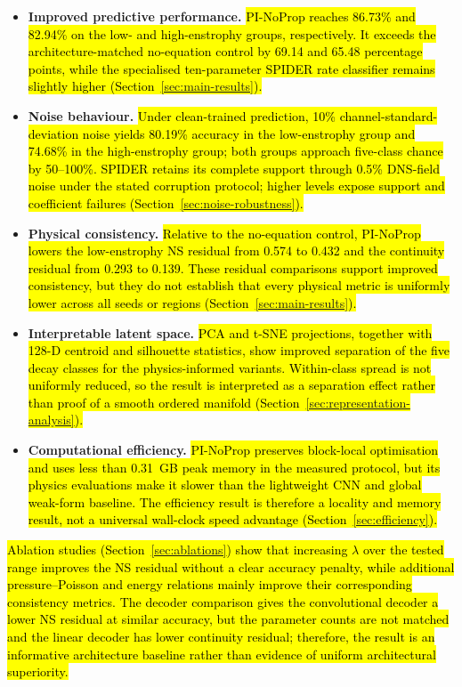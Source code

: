 \documentclass[preprint,12pt]{elsarticle}
\newcommand{\rev}[1]{\hl{#1}}
\begin{document}
\begin{itemize}
    \item \textbf{Improved predictive performance.} \rev{PI-NoProp reaches 86.73\% and 82.94\% on the low- and high-enstrophy groups, respectively. It exceeds the architecture-matched no-equation control by 69.14 and 65.48 percentage points, while the specialised ten-parameter SPIDER rate classifier remains slightly higher (Section~\ref{sec:main-results}).}
    
    \item \textbf{Noise behaviour.} \rev{Under clean-trained prediction, 10\% channel-standard-deviation noise yields 80.19\% accuracy in the low-enstrophy group and 74.68\% in the high-enstrophy group; both groups approach five-class chance by 50--100\%. SPIDER retains its complete support through 0.5\% DNS-field noise under the stated corruption protocol; higher levels expose support and coefficient failures (Section~\ref{sec:noise-robustness}).}
    
    \item \textbf{Physical consistency.} \rev{Relative to the no-equation control, PI-NoProp lowers the low-enstrophy NS residual from 0.574 to 0.432 and the continuity residual from 0.293 to 0.139. These residual comparisons support improved consistency, but they do not establish that every physical metric is uniformly lower across all seeds or regions (Section~\ref{sec:main-results}).}
    
    \item \textbf{Interpretable latent space.} \rev{PCA and t-SNE projections, together with 128-D centroid and silhouette statistics, show improved separation of the five decay classes for the physics-informed variants. Within-class spread is not uniformly reduced, so the result is interpreted as a separation effect rather than proof of a smooth ordered manifold (Section~\ref{sec:representation-analysis}).}
    
    \item \textbf{Computational efficiency.} \rev{PI-NoProp preserves block-local optimisation and uses less than 0.31~GB peak memory in the measured protocol, but its physics evaluations make it slower than the lightweight CNN and global weak-form baseline. The efficiency result is therefore a locality and memory result, not a universal wall-clock speed advantage (Section~\ref{sec:efficiency}).}
\end{itemize}

\rev{Ablation studies (Section~\ref{sec:ablations}) show that increasing $\lambda$ over the tested range improves the NS residual without a clear accuracy penalty, while additional pressure--Poisson and energy relations mainly improve their corresponding consistency metrics. The decoder comparison gives the convolutional decoder a lower NS residual at similar accuracy, but the parameter counts are not matched and the linear decoder has lower continuity residual; therefore, the result is an informative architecture baseline rather than evidence of uniform architectural superiority.}
\end{document}
